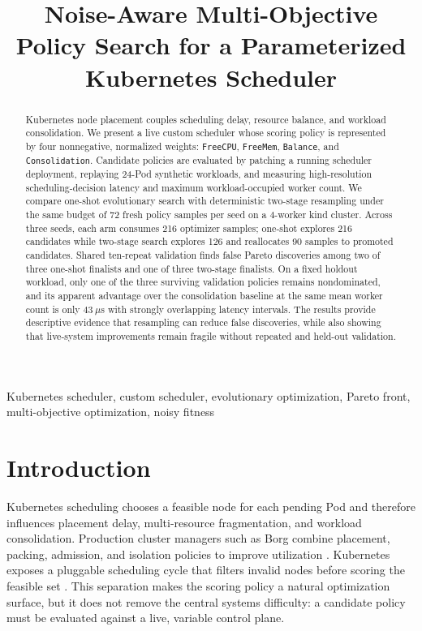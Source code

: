 \documentclass[conference]{IEEEtran}
\title{Noise-Aware Multi-Objective Policy Search for a Parameterized Kubernetes Scheduler}
\author{
\IEEEauthorblockN{Ismail Tarim}
\IEEEauthorblockA{
Izmir Katip Celebi University \\
Izmir, Turkiye \\
240401098@ogr.ikc.edu.tr
}
}
\begin{document}

\maketitle

\begin{abstract}
Kubernetes node placement couples scheduling delay, resource balance, and workload consolidation. We present a live custom scheduler whose scoring policy is represented by four nonnegative, normalized weights: \texttt{FreeCPU}, \texttt{FreeMem}, \texttt{Balance}, and \texttt{Consolidation}. Candidate policies are evaluated by patching a running scheduler deployment, replaying 24-Pod synthetic workloads, and measuring high-resolution scheduling-decision latency and maximum workload-occupied worker count. We compare one-shot evolutionary search with deterministic two-stage resampling under the same budget of 72 fresh policy samples per seed on a 4-worker kind cluster. Across three seeds, each arm consumes 216 optimizer samples; one-shot explores 216 candidates while two-stage search explores 126 and reallocates 90 samples to promoted candidates. Shared ten-repeat validation finds false Pareto discoveries among two of three one-shot finalists and one of three two-stage finalists. On a fixed holdout workload, only one of the three surviving validation policies remains nondominated, and its apparent advantage over the consolidation baseline at the same mean worker count is only $43~\mu$s with strongly overlapping latency intervals. The results provide descriptive evidence that resampling can reduce false discoveries, while also showing that live-system improvements remain fragile without repeated and held-out validation.
\end{abstract}

\begin{IEEEkeywords}
Kubernetes scheduler, custom scheduler, evolutionary optimization, Pareto front, multi-objective optimization, noisy fitness
\end{IEEEkeywords}

\section{Introduction}
Kubernetes scheduling chooses a feasible node for each pending Pod and therefore influences placement delay, multi-resource fragmentation, and workload consolidation. Production cluster managers such as Borg combine placement, packing, admission, and isolation policies to improve utilization \cite{ref-borg}. Kubernetes exposes a pluggable scheduling cycle that filters invalid nodes before scoring the feasible set \cite{ref-k8s-framework}. This separation makes the scoring policy a natural optimization surface, but it does not remove the central systems difficulty: a candidate policy must be evaluated against a live, variable control plane.
\end{document}
